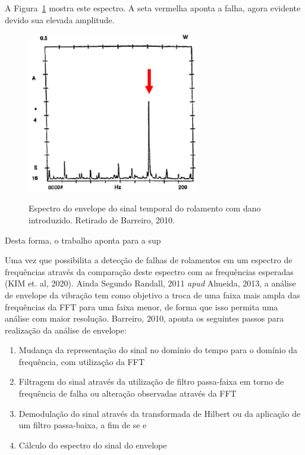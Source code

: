 \documentclass[
	12pt,				
	oneside,			
	a4paper,			
	english,			
	brazil,			
	]{abntex2ppgsi}
\begin{document}
A Figura~\ref{espectro_do_envelope_barreiro} mostra este espectro. A seta vermelha aponta a falha, agora evidente devido sua elevada amplitude.

\begin{figure}[H]
\centering
\caption {Espectro do envelope do sinal temporal do rolamento com dano introduzido. Retirado de Barreiro, 2010.}
\includegraphics[width=\textwidth,height=70mm,keepaspectratio]{espectro_do_envelope_barreiro}
\label{espectro_do_envelope_barreiro}
\end{figure}

Desta forma, o trabalho aponta para a sup

Uma vez que possibilita a detecção de falhas de rolamentos em um espectro de frequências através da comparação deste espectro com as frequências esperadas (KIM et. al, 2020). Ainda Segundo Randall, 2011 \textit{apud} Almeida, 2013, a análise de envelope da vibração tem como objetivo a troca de uma faixa mais ampla das frequências da FFT para uma faixa menor, de forma que isso permita uma análise com maior resolução. Barreiro, 2010, aponta os seguintes passos para realização da análise de envelope:

\begin{enumerate}
	\item Mudança da representação do sinal no domínio do tempo para o domínio da frequência, com utilização da FFT
	\item Filtragem do sinal através da utilização de filtro passa-faixa em torno de frequência de falha ou alteração observadas através da FFT
	\item Demodulação do sinal através da transformada de Hilbert ou da aplicação de um filtro passa-baixa, a fim de se e
	\item Cálculo do espectro do sinal do envelope
\end{enumerate}
\end{document}
